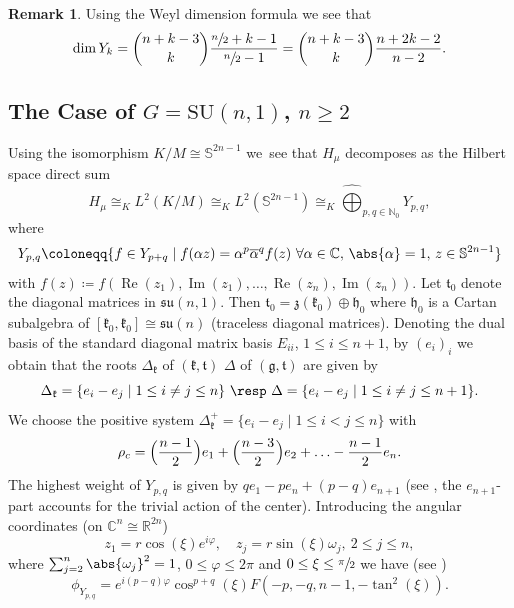 \documentclass[JEP,XML,SOM,NoFloatCountersInSection,Unicode,published]{cedram}
\theoremstyle{definition}
\newtheorem{remark}[theorem]{Remark}
\DeclarePairedDelimiter{\abs}\lvert\rvert
\newcommand{\mb}[1]{\ensuremath{\mathbb{#1}}}
\newcommand{\mf}[1]{\ensuremath{\mathfrak{#1}}}
\newcommand{\on}[1]{\ensuremath{\operatorname{#1}}}
\newcommand{\rhoc}{\ensuremath{\rho_c}}
\newcommand{\C}{\ensuremath{\mathbb{C}}}
\newcommand{\pst}[1]{\ensuremath{H_{#1}}}
\newcommand{\GSU}[1]{\ensuremath{\mathrm{SU}(#1,1)}}
\begin{document}
\begin{remark}\label{rem:dim_Yl}
Using the Weyl dimension formula we see that
\[
\dim Y_k = \binom{n+k-3}{k}\frac{\sfrac{n}2+k-1}{\sfrac{n}2-1}=\binom{n+k-3}{k}\frac{n+2k-2}{n-2}.
\]
\end{remark}

\subsection{\texorpdfstring{The Case of $G=\GSU{n}$, $n\geq 2$}{The Case of G=SU(n,1), n>=2}}
Using the isomorphism $K/M\cong\mb S^{2n-1}$ we~see that $\pst{\mu}$ decomposes as the Hilbert space direct sum\vspace*{-3pt}
\begin{equation}\label{eq:app_KM_sphere_iso_C}
\pst{\mu}\cong_KL^2(K/M)\cong_KL^2(\mb S^{2n-1})\cong_K\widehat\bigoplus_{p,q\in\mathbb{N}_0}Y_{p,q},
\end{equation}
where\vspace*{-3pt}
\begin{equation}\label{eq:sph_harm_Ypq_SUn}
Y_{p,q}\coloneqq\{f\in Y_{p+q}\mid f(\alpha z)=\alpha^{p}\overline{\alpha}^qf(z)\ \forall\alpha\in\C,\,\abs{\alpha}=1,\,z\in\mathbb S^{2n-1}\}
\end{equation}
with $f(z)\coloneqq f(\on{Re}(z_1), \on{Im}(z_1),\ldots,\on{Re}(z_n),\on{Im}(z_n))$.
Let $\mf{t}_0$ denote the diagonal matrices in $\mf{su}(n,1)$. Then $\mf{t}_0=\mf{z}(\mf{k}_0)\oplus\mf{h}_0$ where $\mf{h}_0$ is a Cartan subalgebra of $[\mf{k}_0,\mf{k}_0]\cong\mf{su}(n)$ (traceless diagonal matrices). Denoting the dual basis of the standard diagonal matrix basis $E_{ii}$, $1\leq i\leq n+1$, by $(e_i)_i$ we obtain that the roots $\Delta_\mf k$ of $(\mf k,\mf t)$ \resp $\Delta$ of $(\mf g,\mf t)$ are given by\vspace*{-3pt}
\begin{equation}\label{eq:roots_C}
\Delta_\mf k=\{e_i-e_j\mid 1\leq i\neq j\leq n\}\text{ \resp }\Delta=\{e_i-e_j\mid 1\leq i\neq j\leq n+1\}.
\end{equation}
We choose the positive system $\Delta^+_\mf k=\{e_i-e_j\mid 1\leq i<j\leq n\}$ with
\[
\rhoc=\Bigl(\frac{n-1}{2}\Bigr)e_1+\Bigl(\frac{n-3}{2}\Bigr)e_2+\ldots-\frac{n-1}{2}e_n.
\]
The highest weight of $Y_{p,q}$ is given by $q e_1-p e_n+(p-q)e_{n+1}$ (see \eg \cite[Ex.\,1 of \S V.1, p.\,276]{knapplie}, the $e_{n+1}$-part accounts for the trivial action of the center). Introducing the angular coordinates (on $\C^n\cong\mb{R}^{2n}$)\vspace*{-3pt}
\[
z_1=r\cos(\xi)e^{i\varphi},\quad z_j=r\sin(\xi)\omega_j,\ 2\leq j\leq n,
\]
where $\sum_{j=2}^n\abs{\omega_j}^2=1$, $0\leq\varphi\leq 2\pi$ and $0\leq\xi\leq\sfrac{\pi}{2}$ we have (see \cite[Th.\,3.1(3)]{JW})
\[
\phi_{Y_{p,q}}=e^{i(p-q)\varphi}\cos^{p+q}(\xi)F(-p,-q,n-1,-\tan^2(\xi)).
\]
\end{document}
